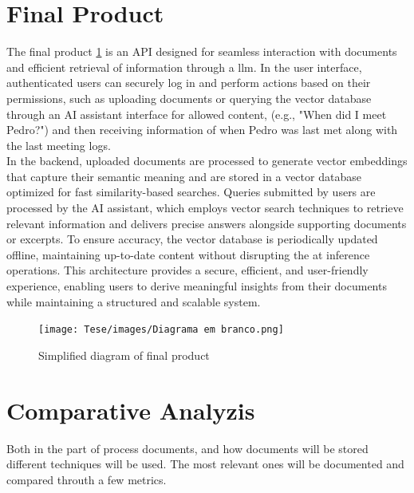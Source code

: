 \section{Final Product}
The final product \ref{fig:diagram_final} is an API designed for seamless interaction with documents and efficient retrieval of information through a \acrshort{llm}. In the user interface, authenticated users can securely log in and perform actions based on their permissions, such as uploading documents or querying the vector database through an AI assistant interface for allowed content, (e.g., "When did I meet Pedro?") and then receiving information of when Pedro was last met along with the last meeting logs. \\
In the backend, uploaded documents are processed to generate vector embeddings that capture their semantic meaning and are stored in a vector database optimized for fast similarity-based searches. Queries submitted by users are processed by the AI assistant, which employs vector search techniques to retrieve relevant information and delivers precise answers alongside supporting documents or excerpts. To ensure accuracy, the vector database is periodically updated offline, maintaining up-to-date content without disrupting the at inference operations. This architecture provides a secure, efficient, and user-friendly experience, enabling users to derive meaningful insights from their documents while maintaining a structured and scalable system.
\begin{figure}[H]
    \centering
    \texttt{[image: Tese/images/Diagrama em branco.png]}
    \caption{Simplified diagram of final product}
    \label{fig:diagram_final}
\end{figure}
\section{Comparative Analyzis}
Both in the part of process documents, and how documents will be stored different techniques will be used. The most relevant ones will be documented and compared throuth a few metrics.
